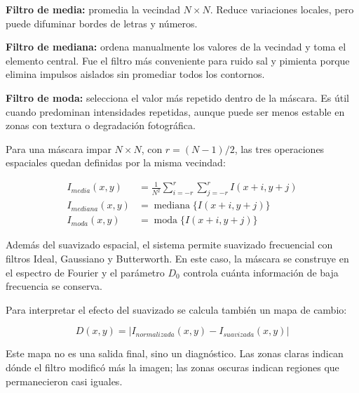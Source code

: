 \documentclass[11pt]{article}
\begin{document}
\textbf{Filtro de media:} promedia la vecindad $N \times N$. Reduce variaciones locales, pero puede difuminar bordes de letras y números.

\textbf{Filtro de mediana:} ordena manualmente los valores de la vecindad y toma el elemento central. Fue el filtro más conveniente para ruido sal y pimienta porque elimina impulsos aislados sin promediar todos los contornos.

\textbf{Filtro de moda:} selecciona el valor más repetido dentro de la máscara. Es útil cuando predominan intensidades repetidas, aunque puede ser menos estable en zonas con textura o degradación fotográfica.

Para una máscara impar $N \times N$, con $r=(N-1)/2$, las tres operaciones espaciales quedan definidas por la misma vecindad:

\begin{align}
    I_{media}(x,y) &=
    \frac{1}{N^2}\sum_{i=-r}^{r}\sum_{j=-r}^{r} I(x+i,y+j) \\
    I_{mediana}(x,y) &=
    \operatorname{mediana}\{I(x+i,y+j)\} \\
    I_{moda}(x,y) &=
    \operatorname{moda}\{I(x+i,y+j)\}
\end{align}

Además del suavizado espacial, el sistema permite suavizado frecuencial con filtros Ideal, Gaussiano y Butterworth. En este caso, la máscara se construye en el espectro de Fourier y el parámetro $D_0$ controla cuánta información de baja frecuencia se conserva.

Para interpretar el efecto del suavizado se calcula también un mapa de cambio:

\begin{equation}
    D(x,y)=|I_{normalizada}(x,y)-I_{suavizada}(x,y)|
\end{equation}

Este mapa no es una salida final, sino un diagnóstico. Las zonas claras indican dónde el filtro modificó más la imagen; las zonas oscuras indican regiones que permanecieron casi iguales.
\end{document}
